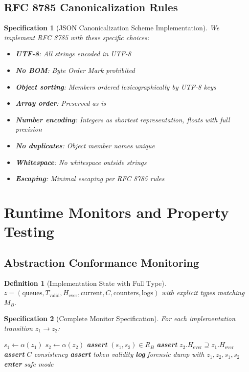 \documentclass[12pt]{article}
\newtheorem{definition}{Definition}[section]
\newtheorem{spec}{Specification}[section]
\begin{document}
\subsection{RFC 8785 Canonicalization Rules}

\begin{spec}[JSON Canonicalization Scheme Implementation]
We implement RFC 8785 with these specific choices:
\begin{itemize}
    \item \textbf{UTF-8}: All strings encoded in UTF-8
    \item \textbf{No BOM}: Byte Order Mark prohibited
    \item \textbf{Object sorting}: Members ordered lexicographically by UTF-8 keys
    \item \textbf{Array order}: Preserved as-is
    \item \textbf{Number encoding}: Integers as shortest representation, floats with full precision
    \item \textbf{No duplicates}: Object member names unique
    \item \textbf{Whitespace}: No whitespace outside strings
    \item \textbf{Escaping}: Minimal escaping per RFC 8785 rules
\end{itemize}
\end{spec}

\section{Runtime Monitors and Property Testing}

\subsection{Abstraction Conformance Monitoring}

\begin{definition}[Implementation State with Full Type]
$z = (\text{queues}, T_{\text{valid}}, H_{\text{ever}}, \text{current}, C, \text{counters}, \text{logs})$ with explicit types matching $M_B$.
\end{definition}

\begin{spec}[Complete Monitor Specification]
For each implementation transition $z_1 \to z_2$:
\begin{algorithmic}[1]
\STATE $s_1 \gets \alpha(z_1)$ 
\STATE $s_2 \gets \alpha(z_2)$
\STATE \textbf{assert} $(s_1, s_2) \in R_B$ 
\STATE \textbf{assert} $z_2.H_{\text{ever}} \supseteq z_1.H_{\text{ever}}$ 
\STATE \textbf{assert} $C$ consistency 
\STATE \textbf{assert} token validity 
    \STATE \textbf{log} forensic dump with $z_1, z_2, s_1, s_2$
    \STATE \textbf{enter} safe mode
\ENDIF
\end{algorithmic}
\end{spec}
\end{document}
